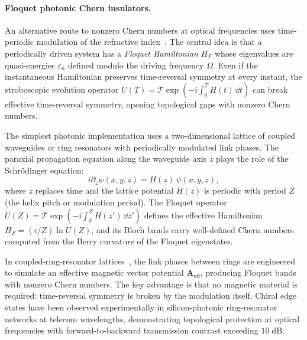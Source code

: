 \paragraph{Floquet photonic Chern insulators.}
An alternative route to nonzero Chern numbers at optical frequencies uses
time-periodic modulation of the refractive index~\cite{rechtsman2013photonic,ozawa2018topological}. The central idea is
that a periodically driven system has a \emph{Floquet Hamiltonian}
$H_F$ whose eigenvalues are quasi-energies $\varepsilon_n$ defined
modulo the driving frequency $\Omega$. Even if the instantaneous
Hamiltonian preserves time-reversal symmetry at every instant, the
stroboscopic evolution operator $U(T) = \mathcal{T}\exp(-i\int_0^T
H(t)\,\dd t)$ can break effective time-reversal symmetry, opening
topological gaps with nonzero Chern numbers.

The simplest photonic implementation uses a two-dimensional lattice
of coupled waveguides or ring resonators with periodically modulated
link phases. The paraxial propagation equation along the waveguide
axis $z$ plays the role of the Schr\"odinger equation:
\begin{equation}
 i\partial_z \psi(x,y,z) = H(z)\,\psi(x,y,z),
 \label{eq:paraxial-floquet}
\end{equation}
where $z$ replaces time and the lattice potential $H(z)$ is periodic
with period $Z$ (the helix pitch or modulation period). The Floquet
operator $U(Z) = \mathcal{T}\exp(-i\int_0^Z H(z')\,\dd z')$ defines
the effective Hamiltonian $H_F = (i/Z)\ln U(Z)$, and its Bloch bands
carry well-defined Chern numbers computed from the Berry curvature of
the Floquet eigenstates.

In coupled-ring-resonator lattices~\cite{hafezi2013imaging}, the link phases between
rings are engineered to simulate an effective magnetic vector potential
$\mathbf{A}_{\mathrm{eff}}$, producing Floquet bands with nonzero
Chern numbers. The key advantage is that no magnetic material is
required: time-reversal symmetry is broken by the modulation itself.
Chiral edge states have been observed experimentally in
silicon-photonic ring-resonator networks at telecom wavelengths,
demonstrating topological protection at optical frequencies with
forward-to-backward transmission contrast exceeding $10\;\mathrm{dB}$.

